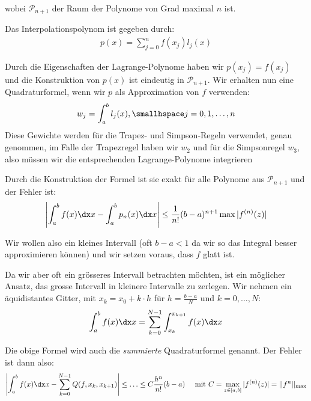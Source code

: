 \vspace{-1.5pc}
wobei $\mathcal{P}_{n + 1}$ der Raum der Polynome von Grad maximal $n$ ist.

Das Interpolationspolynom ist gegeben durch:
\drmvspace
\begin{align*}
    p(x) = \sum_{j = 0}^{n} f(x_j) l_j(x)
\end{align*}

\drmvspace
Durch die Eigenschaften der Lagrange-Polynome haben wir $p(x_j) = f(x_j)$ und die Konstruktion von $p(x)$ ist eindeutig in $\mathcal{P}_{n + 1}$.
Wir erhalten nun eine Quadraturformel, wenn wir $p$ als Approximation von $f$ verwenden:
\rmvspace
\begin{align*}
    w_j = \int_{a}^{b} l_j(x), \smallhspace j = 0, 1, \ldots, n
\end{align*}
Diese Gewichte werden für die Trapez- und Simpson-Regeln verwendet, genau genommen, im Falle der Trapezregel haben wir $w_2$ und für die Simpsonregel $w_3$,
also müssen wir die entsprechenden Lagrange-Polynome integrieren

\drmvspace
Durch die Konstruktion der Formel ist sie exakt für alle Polynome aus $\mathcal{P}_{n + 1}$ und der Fehler ist:
\rmvspace
\begin{align*}
    \left| \int_{a}^{b} f(x) \dx x - \int_{a}^{b} p_n(x) \dx x \right| \leq \frac{1}{n!}(b - a)^{n + 1} \max|f^{(n)}(z)|
\end{align*}

\drmvspace
Wir wollen also ein kleines Intervall (oft $b - a < 1$ da wir so das Integral besser approximieren können) und wir setzen voraus, dass $f$ glatt ist.

Da wir aber oft ein grösseres Intervall betrachten möchten, ist ein möglicher Ansatz, das grosse Intervall in kleinere Intervalle zu zerlegen.
Wir nehmen ein äquidistantes Gitter, mit $x_k = x_0 + k \cdot h$ für $h = \frac{b - a}{N}$ und $k = 0, \ldots, N$:
\rmvspace
\begin{align*}
    \int_{a}^{b} f(x) \dx x = \sum_{k = 0}^{N - 1} \int_{x_k}^{x_{k + 1}} f(x) \dx x
\end{align*}

\drmvspace
Die obige Formel wird auch die \textit{summierte} Quadraturformel genannt. Der Fehler ist dann also:
\rmvspace
\begin{align*}
    \left| \int_{a}^{b} f(x) \dx x - \sum_{k = 0}^{N - 1} Q(f, x_k, x_{k + 1}) \right| \leq \ldots \leq C \frac{h^n}{n!}(b - a) &  &
    \text{ mit } C = \max_{z \in [a, b]} |f^{(n)}(z)| = ||f^n||_{\max}
\end{align*}

